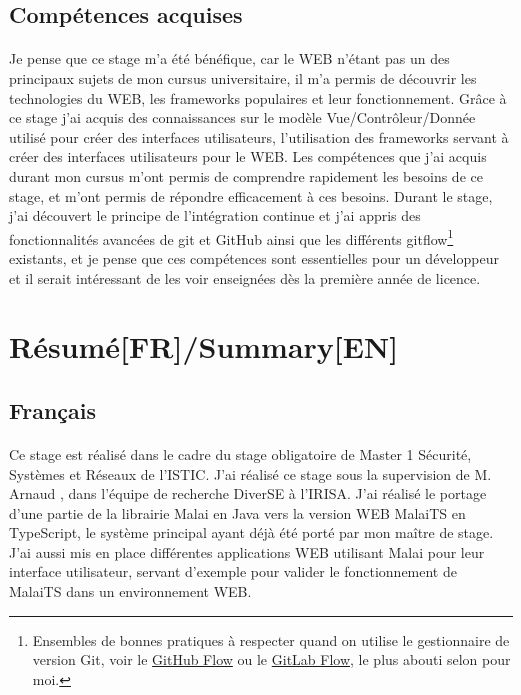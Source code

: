 \documentclass[11pt, a4paper, pdftex]{article}
\begin{document}
        \subsection{Compétences acquises}\label{subsec:compacq}
            \paragraph{}
                Je pense que ce stage m'a été bénéfique, car le WEB n'étant pas un des principaux sujets de mon cursus universitaire, il m'a permis de découvrir les technologies du WEB, les frameworks populaires et leur fonctionnement.
                Grâce à ce stage j'ai acquis des connaissances sur le modèle Vue/Contrôleur/Donnée utilisé pour créer des interfaces utilisateurs, l'utilisation des frameworks servant à créer des interfaces utilisateurs pour le WEB\@.
                Les compétences que j'ai acquis durant mon cursus m'ont permis de comprendre rapidement les besoins de ce stage, et m'ont permis de répondre efficacement à ces besoins.
                Durant le stage, j'ai découvert le principe de l'intégration continue et j'ai appris des fonctionnalités avancées de git et GitHub ainsi que les différents gitflow\footnote{Ensembles de bonnes pratiques à respecter quand on utilise le gestionnaire de version Git, voir le \href{https://guides.github.com/introduction/flow/}{GitHub Flow} ou le \href{https://about.gitlab.com/2014/09/29/gitlab-flow/}{GitLab Flow}, le plus abouti selon pour moi.} existants,
                et je pense que ces compétences sont essentielles pour un développeur et il serait intéressant de les voir enseignées dès la première année de licence.

    \newpage

    \section{Résumé[FR]/Summary[EN]}\label{sec:resume}
        \subsection{Français}\label{subsec:franc}
            \paragraph{}
                Ce stage est réalisé dans le cadre du stage obligatoire de Master 1 Sécurité, Systèmes et Réseaux de l'ISTIC\@.
                J'ai réalisé ce stage sous la supervision de M. Arnaud , dans l'équipe de recherche DiverSE à l'IRISA\@.
                J'ai réalisé le portage d'une partie de la librairie Malai en Java vers la version WEB MalaiTS en TypeScript, le système principal ayant déjà été porté par mon maître de stage.
                J'ai aussi mis en place différentes applications WEB utilisant Malai pour leur interface utilisateur, servant d'exemple pour valider le fonctionnement de MalaiTS dans un environnement WEB\@.
\end{document}
